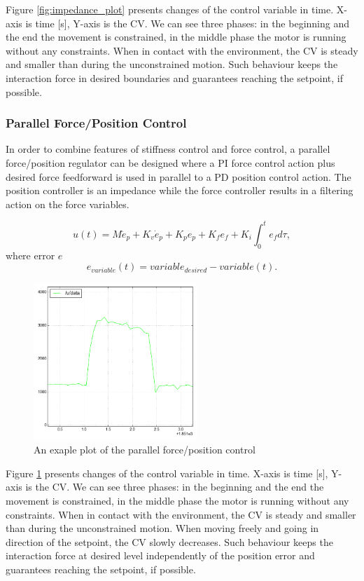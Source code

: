 Figure \ref{fig:impedance_plot} presents changes of the control variable in time. X-axis is time [s], Y-axis is the CV. We can see three phases: in the beginning and the end the movement is constrained, in the middle phase the motor is running without any constraints.
When in contact with the environment, the CV is steady and smaller than during the unconstrained motion.
Such behaviour keeps the interaction force in desired boundaries and guarantees reaching the setpoint, if possible.
 
\subsubsection{Parallel Force/Position Control}
In order to combine features of stiffness control and force control, a parallel force/position regulator can be designed where a PI force control action plus desired force feedforward is used in parallel to a PD position control action.
The position controller is an impedance while the force controller results in a filtering action on the force variables.
 
\begin{equation}
u(t) = M \ddot{e}_p +  K_{v} \dot{e}_p + K_p e_p + K_f e_f + K_i\int_{0}^{t} e_f d\tau,
\end{equation}
where error $e$
\begin{equation}
e_{variable}(t) = variable_{desired} - variable(t).
\end{equation}

\begin{figure}%
 \begin{center} 
  \includegraphics[width=0.55\textwidth]{./stuff/force_pos_plot}
 \end{center}
 \caption{An exaple plot of the parallel force/position control}
 \label{fig:force_pos_plot} 
\end{figure} 

Figure \ref{fig:force_pos_plot} presents changes of the control variable in time. X-axis is time [s], Y-axis is the CV. We can see three phases: in the beginning and the end the movement is constrained, in the middle phase the motor is running without any constraints.
When in contact with the environment, the CV is steady and smaller than during the unconstrained motion. When moving freely and going in direction of the setpoint, the CV slowly decreases.
Such behaviour keeps the interaction force at desired level independently of the position error and guarantees reaching the setpoint, if possible.